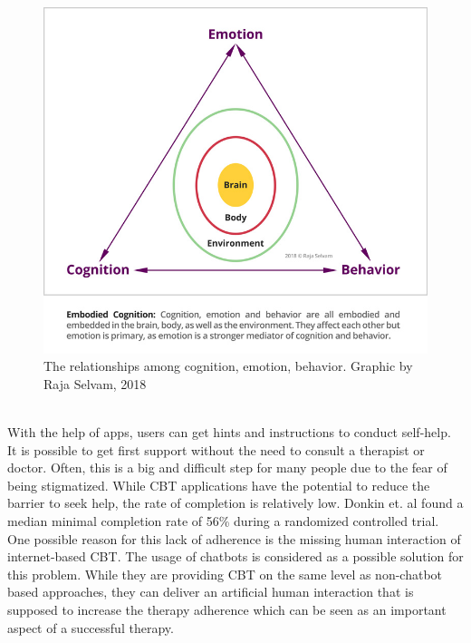 \documentclass[sigconf, nonacm]{acmart}
\begin{document}
\begin{figure}[h]
  \centering
  \includegraphics[width=\linewidth]{cbt_picture}
  \caption[cbt_circle]{The relationships among cognition, emotion, behavior. Graphic by Raja Selvam, 2018\footnotemark}
  \label{fig:cbt_circle}
\end{figure}
\\
With the help of apps, users can get hints and instructions to conduct self-help. It is possible
to get first support without the need to consult a therapist or doctor. Often, this is a big and 
difficult step for many people due to the fear of being stigmatized\cite{Rossler2016}.
While CBT applications have the potential to reduce the barrier to seek help, the rate of completion
is relatively low. Donkin et. al \cite{Donkin} found a median minimal completion rate of 56\% during a randomized controlled trial. 
One possible reason for this lack of adherence is the missing human interaction of internet-based CBT\cite{Ly2017}.
The usage of chatbots is considered as a possible solution for this problem. While they are providing CBT on the same level 
as non-chatbot based approaches, they can deliver an artificial human interaction that is supposed to increase the
therapy adherence which can be seen as an important aspect of a successful therapy. 
\end{document}
